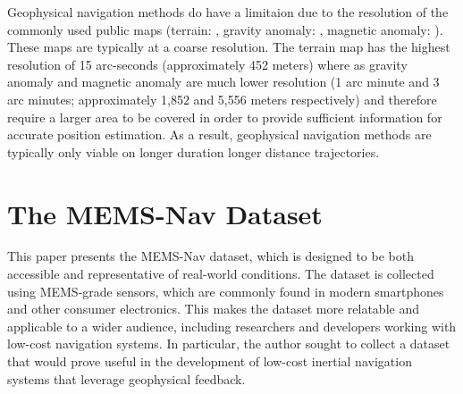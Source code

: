 \documentclass[sageh,times]{sagej}
\begin{document}
Geophysical navigation methods do have a limitaion due to the resolution of the commonly used public maps (terrain: \cite{SANDWELL20211059}, gravity anomaly: \cite{EGM2008}, magnetic anomaly: \cite{wdmam}). These maps are typically at a coarse resolution. The terrain map has the highest resolution of 15 arc-seconds (approximately 452 meters) where as gravity anomaly and magnetic anomaly are much lower resolution (1 arc minute and 3 arc minutes; approximately 1,852 and 5,556 meters respectively) and therefore require a larger area to be covered in order to provide sufficient information for accurate position estimation. As a result, geophysical navigation methods are typically only viable on longer duration longer distance trajectories.

\section{The MEMS-Nav Dataset}
This paper presents the MEMS-Nav dataset, which is designed to be both accessible and representative of real-world conditions. The dataset is collected using MEMS-grade sensors, which are commonly found in modern smartphones and other consumer electronics. This makes the dataset more relatable and applicable to a wider audience, including researchers and developers working with low-cost navigation systems. In particular, the author sought to collect a dataset that would prove useful in the development of low-cost inertial navigation systems that leverage geophysical feedback. 
\end{document}
